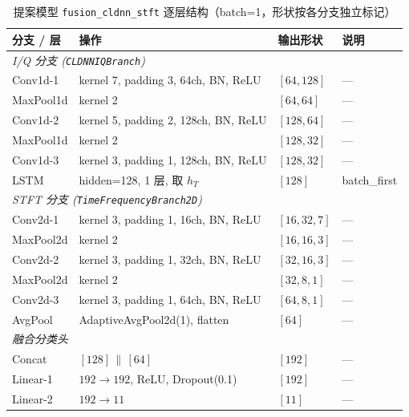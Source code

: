 \begin{table}[htbp]
  \centering
  \caption{提案模型 \texttt{fusion\_cldnn\_stft} 逐层结构（batch=1，形状按各分支独立标记）}
  \label{tab:fusion-cldnn-stft-arch}
  \small
  \begin{tabular}{llll}
    \toprule
    分支 / 层 & 操作 & 输出形状 & 说明 \\
    \midrule
    \multicolumn{4}{l}{\textit{I/Q 分支 (\texttt{CLDNNIQBranch})}} \\
    \quad Conv1d-1  & kernel 7, padding 3, 64ch, BN, ReLU  & \([64,128]\) & --- \\
    \quad MaxPool1d & kernel 2                               & \([64, 64]\) & --- \\
    \quad Conv1d-2  & kernel 5, padding 2, 128ch, BN, ReLU & \([128,64]\) & --- \\
    \quad MaxPool1d & kernel 2                               & \([128,32]\) & --- \\
    \quad Conv1d-3  & kernel 3, padding 1, 128ch, BN, ReLU & \([128,32]\) & --- \\
    \quad LSTM      & hidden=128, 1 层, 取 \(h_T\)         & \([128]\)    & batch\_first \\
    \midrule
    \multicolumn{4}{l}{\textit{STFT 分支 (\texttt{TimeFrequencyBranch2D})}} \\
    \quad Conv2d-1  & kernel 3, padding 1, 16ch, BN, ReLU  & \([16,32,7]\) & --- \\
    \quad MaxPool2d & kernel 2                               & \([16,16,3]\) & --- \\
    \quad Conv2d-2  & kernel 3, padding 1, 32ch, BN, ReLU  & \([32,16,3]\) & --- \\
    \quad MaxPool2d & kernel 2                               & \([32, 8,1]\) & --- \\
    \quad Conv2d-3  & kernel 3, padding 1, 64ch, BN, ReLU  & \([64, 8,1]\) & --- \\
    \quad AvgPool   & AdaptiveAvgPool2d(1), flatten          & \([64]\)      & --- \\
    \midrule
    \multicolumn{4}{l}{\textit{融合分类头}} \\
    \quad Concat    & \([128]\,\|\,[64]\)                   & \([192]\)    & --- \\
    \quad Linear-1  & \(192\to192\), ReLU, Dropout(0.1)    & \([192]\)    & --- \\
    \quad Linear-2  & \(192\to11\)                          & \([11]\)     & --- \\
    \bottomrule
  \end{tabular}
\end{table}


